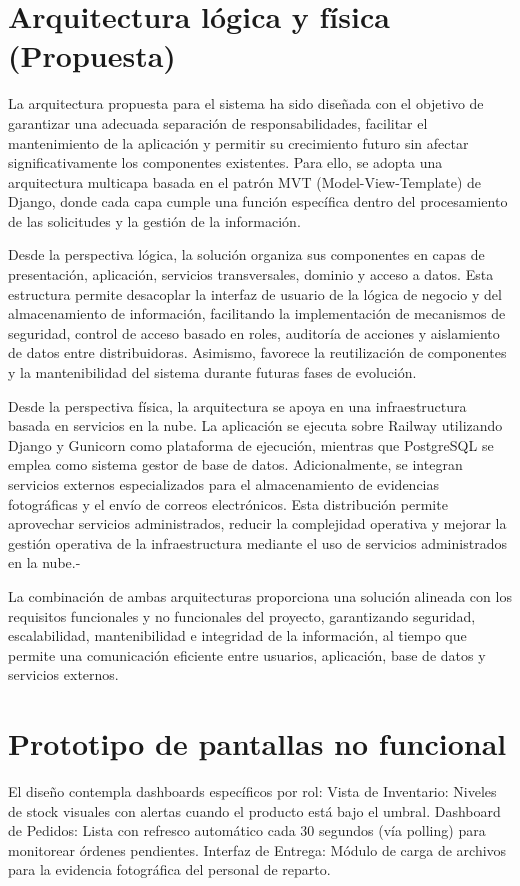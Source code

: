 \documentclass[12pt,a4paper]{report}
\begin{document}
\section{Arquitectura lógica y física (Propuesta)}

La arquitectura propuesta para el sistema ha sido diseñada con el objetivo de garantizar una adecuada separación de responsabilidades, facilitar el mantenimiento de la aplicación y permitir su crecimiento futuro sin afectar significativamente los componentes existentes. Para ello, se adopta una arquitectura multicapa basada en el patrón MVT (Model-View-Template) de Django, donde cada capa cumple una función específica dentro del procesamiento de las solicitudes y la gestión de la información.

Desde la perspectiva lógica, la solución organiza sus componentes en capas de presentación, aplicación, servicios transversales, dominio y acceso a datos. Esta estructura permite desacoplar la interfaz de usuario de la lógica de negocio y del almacenamiento de información, facilitando la implementación de mecanismos de seguridad, control de acceso basado en roles, auditoría de acciones y aislamiento de datos entre distribuidoras. Asimismo, favorece la reutilización de componentes y la mantenibilidad del sistema durante futuras fases de evolución.

Desde la perspectiva física, la arquitectura se apoya en una infraestructura basada en servicios en la nube. La aplicación se ejecuta sobre Railway utilizando Django y Gunicorn como plataforma de ejecución, mientras que PostgreSQL se emplea como sistema gestor de base de datos. Adicionalmente, se integran servicios externos especializados para el almacenamiento de evidencias fotográficas y el envío de correos electrónicos. Esta distribución permite aprovechar servicios administrados, reducir la complejidad operativa y mejorar la gestión operativa de la infraestructura mediante el uso de servicios administrados en la nube.-

La combinación de ambas arquitecturas proporciona una solución alineada con los requisitos funcionales y no funcionales del proyecto, garantizando seguridad, escalabilidad, mantenibilidad e integridad de la información, al tiempo que permite una comunicación eficiente entre usuarios, aplicación, base de datos y servicios externos.


\section{Prototipo de pantallas no funcional}
El diseño contempla dashboards específicos por rol:
Vista de Inventario: Niveles de stock visuales con alertas cuando el producto está bajo el umbral.
Dashboard de Pedidos: Lista con refresco automático cada 30 segundos (vía polling) para monitorear órdenes pendientes.
Interfaz de Entrega: Módulo de carga de archivos para la evidencia fotográfica del personal de reparto.
\end{document}

